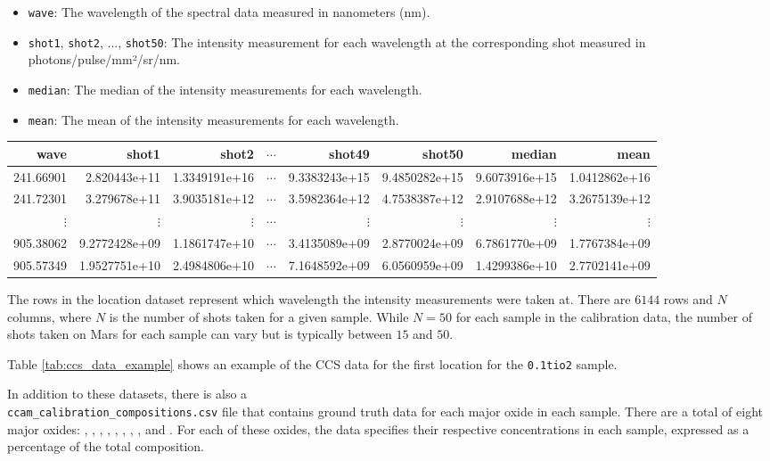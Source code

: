 \begin{itemize}
    \item \texttt{wave}: The wavelength of the spectral data measured in nanometers (nm).
    \item \texttt{shot1}, \texttt{shot2}, ..., \texttt{shot50}: The intensity measurement for each wavelength at the corresponding shot measured in photons/pulse/mm²/sr/nm.
    \item \texttt{median}: The median of the intensity measurements for each wavelength.
    \item \texttt{mean}: The mean of the intensity measurements for each wavelength.
\end{itemize}

\begin{table*}[!b]
\centering
\begin{tabular}{rrrrrrrr}
\toprule
     wave &         shot1 &         shot2 &  $\cdots$ &        shot49 &       shot50  & median        & mean          \\
\midrule
241.66901 & 2.820443e+11  & 1.3349191e+16 & $\cdots$  & 9.3383243e+15 & 9.4850282e+15 & 9.6073916e+15 & 1.0412862e+16 \\
241.72301 & 3.279678e+11  & 3.9035181e+12 & $\cdots$  & 3.5982364e+12 & 4.7538387e+12 & 2.9107688e+12 & 3.2675139e+12 \\
$\vdots$  & $\vdots$      & $\vdots$      & $\cdots$  & $\vdots$      & $\vdots$      & $\vdots$      & $\vdots$      \\
905.38062 & 9.2772428e+09 & 1.1861747e+10 & $\cdots$  & 3.4135089e+09 & 2.8770024e+09 & 6.7861770e+09 & 1.7767384e+09 \\
905.57349 & 1.9527751e+10 & 2.4984806e+10 & $\cdots$  & 7.1648592e+09 & 6.0560959e+09 & 1.4299386e+10 & 2.7702141e+09 \\
\bottomrule
\end{tabular}
\caption{Example of CCS data for the first sample in the \texttt{0.1tio2} directory.}
\label{tab:ccs_data_example}
\end{table*}

The rows in the location dataset represent which wavelength the intensity measurements were taken at.
There are $6144$ rows and $N$ columns, where $N$ is the number of shots taken for a given sample.
While $N=50$ for each sample in the calibration data, the number of shots taken on Mars for each sample can vary but is typically between $15$ and $50$.

Table \ref{tab:ccs_data_example} shows an example of the CCS data for the first location for the \texttt{0.1tio2} sample.

In addition to these datasets, there is also a \\ \texttt{ccam\_calibration\_compositions.csv} file that contains ground truth data for each major oxide in each sample.
There are a total of eight major oxides: , , , , , , , , and .
For each of these oxides, the data specifies their respective concentrations in each sample, expressed as a percentage of the total composition.